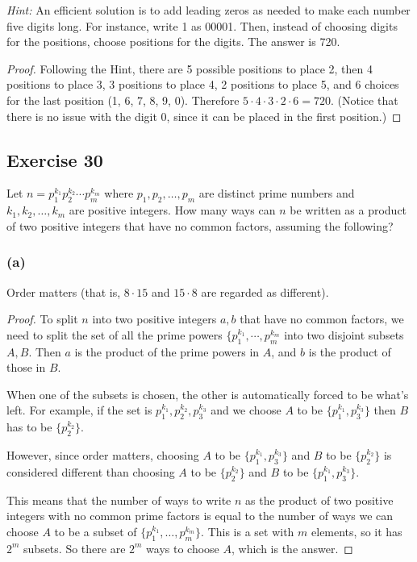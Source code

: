 \documentclass[14pt]{extarticle}
\begin{document}
{\it Hint:} An efficient solution is to add leading zeros as needed to make each number five digits long. For
instance, write 1 as 00001. Then, instead of choosing digits for the positions, choose positions for the digits.
The answer is 720.

\begin{proof}
     Following the Hint, there are 5 possible positions to place 2, then 4 positions to place 3, 3 positions to place 4, 2
     positions to place 5, and 6 choices for the last position (1, 6, 7, 8, 9, 0). Therefore \(5 \cdot 4 \cdot 3 \cdot 2
     \cdot 6 = 720\). (Notice that there is no issue with the digit 0, since it can be placed in the first position.)
\end{proof}

\subsection{Exercise 30}
Let \(n = p_1^{k_1} p_2^{k_2} \cdots p_m^{k_m}\) where \(p_1, p_2, \ldots, p_m\) are distinct prime numbers and
\(k_1, k_2, \ldots, k_m\) are positive integers. How many ways can $n$ be written as a product of two positive
integers that have no common factors, assuming the following?

\subsubsection{(a)}
Order matters (that is, \(8 \cdot 15\) and \(15 \cdot 8\) are regarded as different).

\begin{proof}
     To split $n$ into two positive integers $a, b$ that have no common factors, we need to split the set of all the prime
     powers \(\{p_1^{k_1}, \cdots, p_m^{k_m}\) into two disjoint subsets $A, B$. Then $a$ is the product of the prime powers in $A$, and $b$ is the product of those in $B$.

     When one of the subsets is chosen, the other is automatically forced to be what's left. For example, if the
     set is \(p_1^{k_1}, p_2^{k_2}, p_3^{k_3}\) and we choose $A$ to be \(\{p_1^{k_1}, p_3^{k_3}\}\) then $B$ has to be
     \(\{p_2^{k_2}\}\).

     However, since order matters, choosing $A$ to be \(\{p_1^{k_1}, p_3^{k_3}\}\) and $B$ to be \(\{p_2^{k_2}\}\)
     is considered different than choosing $A$ to be \(\{p_2^{k_2}\}\) and $B$ to be \(\{p_1^{k_1}, p_3^{k_3}\}\).

     This means that the number of ways to write $n$ as the product of two positive integers with no common prime
     factors is equal to the number of ways we can choose $A$ to be a subset of \(\{p_1^{k_1}, \ldots, p_m^{k_m}\}\). This
     is a set with $m$ elements, so it has $2^m$ subsets. So there are $2^m$ ways to choose $A$, which is the answer.
\end{proof}
\end{document}

